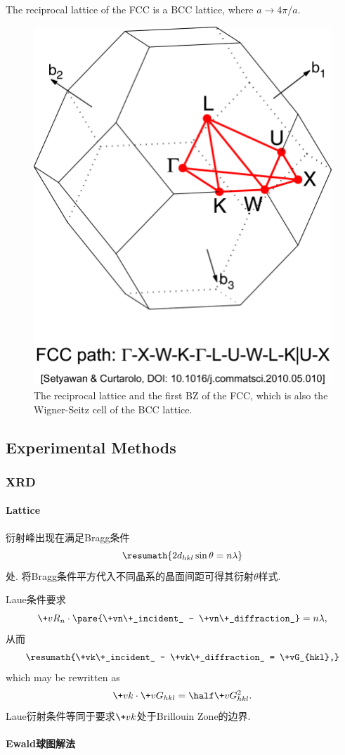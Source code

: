 \documentclass[hidelinks]{ctexart}
\begin{document}
The reciprocal lattice of the FCC is a BCC lattice, where $a\rightarrow 4\pi/a$.
\begin{figure}[ht]
    \centering
    \includegraphics[width=.3\textwidth]{src/FCCBZ.png}
    \caption{The reciprocal lattice and the first BZ of the FCC, which is also the Wigner-Seitz cell of the BCC lattice.}
\end{figure}




\subsection{Experimental Methods} %
\label{sub:experimental_methods}

\subsubsection{XRD} %
\label{ssub:xrd}

\paragraph{Lattice} %
\label{par:lattice}

衍射峰出现在满足Bragg条件
\[ \resumath{2d_{hkl}\sin\theta = n\lambda} \]
处. 将Bragg条件平方代入不同晶系的晶面间距可得其衍射$\theta$样式.
\par
Laue条件要求
\[ \+vR_n\cdot \pare{\+vn\+_incident_ - \+vn\+_diffraction_} = n\lambda, \]
从而
\[ \resumath{\+vk\+_incident_ - \+vk\+_diffraction_ = \+vG_{hkl},} \]
which may be rewritten as
\[ \+vk\cdot \+vG_{hkl} = \half \+vG_{hkl}^2. \]
Laue衍射条件等同于要求$\+vk$处于Brillouin Zone的边界.


\paragraph{Ewald球图解法} %
\label{par:ewald球图解法}
\end{document}
